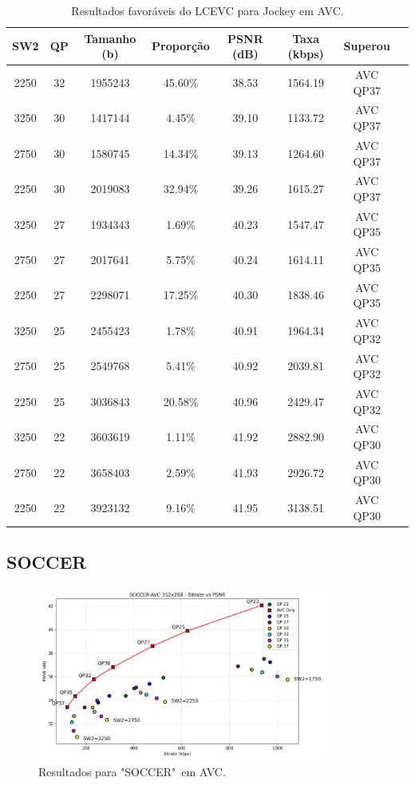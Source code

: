 \begin{table}[h]
    \centering
    \label{tab:jockey-avc-lcevc}
    \begin{tabular}{|c|c|c|c|c|c|c|c|}
        \hline
        \textbf{SW2} & \textbf{QP} & \textbf{Tamanho (b)} & \textbf{Proporção} & \textbf{PSNR (dB)} & \textbf{Taxa (kbps)} & \textbf{Superou} \\
        \hline
            2250 & 32 & 1955243 & 45.60\% & 38.53 & 1564.19 & AVC QP37\\
            3250 & 30 & 1417144 & 4.45\% & 39.10 & 1133.72 & AVC QP37 \\
            2750 & 30 & 1580745 & 14.34\% & 39.13 & 1264.60 & AVC QP37 \\
            2250 & 30 & 2019083 & 32.94\% & 39.26 & 1615.27 & AVC QP37 \\
            3250 & 27 & 1934343 & 1.69\% & 40.23 & 1547.47 & AVC QP35 \\
            2750 & 27 & 2017641 & 5.75\% & 40.24 & 1614.11 & AVC QP35 \\
            2250 & 27 & 2298071 & 17.25\% & 40.30 & 1838.46 & AVC QP35 \\
            3250 & 25 & 2455423 & 1.78\% & 40.91 & 1964.34 & AVC QP32\\
            2750 & 25 & 2549768 & 5.41\% & 40.92 & 2039.81 & AVC QP32\\
            2250 & 25 & 3036843 & 20.58\% & 40.96 & 2429.47 & AVC QP32\\
            3250 & 22 & 3603619 & 1.11\% & 41.92 & 2882.90 & AVC QP30 \\
            2750 & 22 & 3658403 & 2.59\% & 41.93 & 2926.72 & AVC QP30 \\
            2250 & 22 & 3923132 & 9.16\% & 41.95 & 3138.51 & AVC QP30 \\
        \hline
    \end{tabular}
    \caption{Resultados favoráveis do LCEVC para Jockey em AVC.}
\end{table}

\subsection{SOCCER}

\begin{figure}[h]
    \centering
    \includegraphics[width=0.85\textwidth]{img/SOCCER-AVC.png}
    \caption{Resultados para "SOCCER"\ em \acrshort{AVC}. \cite{xiph}}
    \label{fig:SOCCER}
\end{figure}

